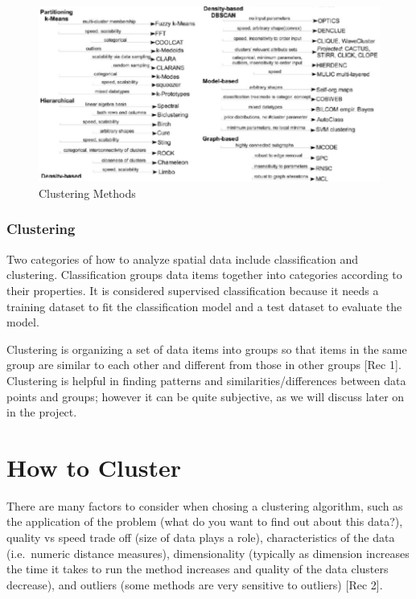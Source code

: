 \documentclass[12pt,twoside]{amherstthesis}
\begin{document}
  \begin{figure}[htbp]
  \centering
  \includegraphics[scale = 0.5,angle = 0]{clustering_methods.png}
  \caption[Clustering Methods]{\normalsize{Clustering Methods}}
  \label{fig:Clustering}
  \end{figure}
  
  \subsection{Clustering}\label{clustering}
  
  Two categories of how to analyze spatial data include classification and
  clustering. Classification groups data items together into categories
  according to their properties. It is considered supervised
  classification because it needs a training dataset to fit the
  classification model and a test dataset to evaluate the model.
  
  Clustering is organizing a set of data items into groups so that items
  in the same group are similar to each other and different from those in
  other groups {[}Rec 1{]}. Clustering is helpful in finding patterns and
  similarities/differences between data points and groups; however it can
  be quite subjective, as we will discuss later on in the project.
  
  \chapter{How to Cluster}\label{rmd-basics}
  
  There are many factors to consider when chosing a clustering algorithm,
  such as the application of the problem (what do you want to find out
  about this data?), quality vs speed trade off (size of data plays a
  role), characteristics of the data (i.e.~numeric distance measures),
  dimensionality (typically as dimension increases the time it takes to
  run the method increases and quality of the data clusters decrease), and
  outliers (some methods are very sensitive to outliers) {[}Rec 2{]}.
  
\end{document}
